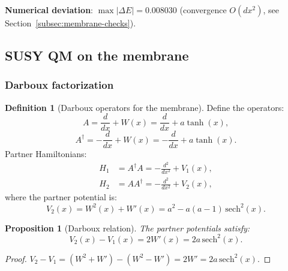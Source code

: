 \documentclass[11pt,a4paper]{article}
\newtheorem{proposition}[theorem]{Proposition}
\theoremstyle{definition}
\newtheorem{definition}[theorem]{Definition}
\begin{document}
\medskip\noindent
\textbf{Numerical deviation}: $\max|\Delta E| = 0.008030$
(convergence $O(dx^2)$, see Section~\ref{subsec:membrane-checks}).

\subsection{SUSY QM on the membrane}
\label{subsec:membrane-susy}

\subsubsection{Darboux factorization}

\begin{definition}[Darboux operators for the membrane]
\label{def:membrane-darboux}
Define the operators:
\begin{equation}
    A = \frac{d}{dx} + W(x) = \frac{d}{dx} + a \tanh(x),
    \label{eq:membrane-A}
\end{equation}
\begin{equation}
    A^\dagger = -\frac{d}{dx} + W(x) = -\frac{d}{dx} + a \tanh(x).
    \label{eq:membrane-Adag}
\end{equation}
Partner Hamiltonians:
\begin{align}
    H_1 &= A^\dagger A = -\frac{d^2}{dx^2} + V_1(x),
    \label{eq:membrane-H1} \\
    H_2 &= A A^\dagger = -\frac{d^2}{dx^2} + V_2(x),
    \label{eq:membrane-H2}
\end{align}
where the partner potential is:
\begin{equation}
    V_2(x) = W^2(x) + W'(x) = a^2 - a(a-1) \, \mathrm{sech}^2(x).
    \label{eq:membrane-V2}
\end{equation}
\end{definition}

\begin{proposition}[Darboux relation]
\label{prop:membrane-darboux}
The partner potentials satisfy:
\begin{equation}
    V_2(x) - V_1(x) = 2W'(x) = 2a \, \mathrm{sech}^2(x).
    \label{eq:membrane-darboux-relation}
\end{equation}
\end{proposition}

\begin{proof}
$V_2 - V_1 = (W^2 + W') - (W^2 - W') = 2W' = 2a \, \mathrm{sech}^2(x)$.
\end{proof}
\end{document}
